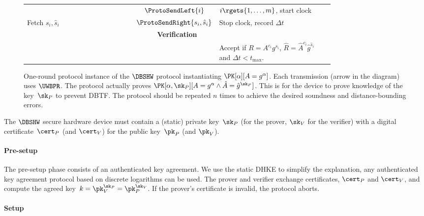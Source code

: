 \begin{figure*}
\begin{tabular}{p{0.40\linewidth}cp{0.40\linewidth}}
    & \(\ProtoSendLeft{i}\)
    & \(i\rgets \{1, \dotsc, m\}\), start clock
    \\

    Fetch \(s_i, \hat s_i\)
    & \(\ProtoSendRight{s_i, \hat s_i}\)
    & Stop clock, record \(\Delta t\)
    \\

    \midrule
    \multicolumn{3}{c}{\textbf{Verification}}
    \\

    &
    & Accept if \(R = A^{c_i} g^{s_i}\),
      \(\hat R =  \hat A^{c_i} \hat g^{\hat s_i}\) and
      \(\Delta t < t_{\max}\).
    \\
    
  \end{tabular}
  \caption{%
    One-round protocol instance of the \(\DBSHW\) protocol instantiating 
    \(\PK[\alpha][A = g^\alpha]\).
    Each transmission (arrow in the diagram) uses \(\UWBPR\).
    The protocol actually proves \(\PK[\alpha, \sk_P][A = g^\alpha \land
      \hat A = \hat g^{\sk_P}]\).
    This is for the device to prove knowledge of the key~\(\sk_P\) to prevent 
    \ac{DBTF}.
    The protocol should be repeated \(n\) times to achieve the desired 
    soundness and distance-bounding errors.
  }%
  \label{DBSHW-overview}
\end{figure*}

The \(\DBSHW\) secure hardware device must contain a (static) private 
key~\(\sk_P\) (for the prover, \(\sk_V\) for the verifier) with a digital 
certificate~\(\cert_P\) (and \(\cert_V\)) for the public key~\(\pk_P\) (and 
\(\pk_V\)).

\paragraph*{Pre-setup}

The pre-setup phase consists of an authenticated key agreement.
We use the static \ac{DHKE} to simplify the explanation, any authenticated key 
agreement protocol based on discrete logarithms can be used.
The prover and verifier exchange certificates, \(\cert_P\) and \(\cert_V\), and 
compute the agreed key~\(k = \pk_V^{\sk_P} = \pk_P^{\sk_V}\).
If the prover's certificate is invalid, the protocol aborts.

\paragraph*{Setup}

